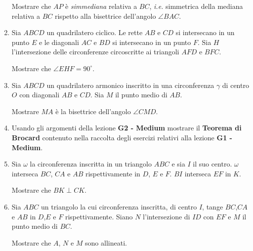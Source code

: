 \begin{enumerate}
    Mostrare che $AP$ è \textit{simmediana} relativa a $BC$, \textit{i.e.} simmetrica della mediana relativa a $BC$ rispetto alla bisettrice dell'angolo $\angle BAC$.
    
    \item Sia $ABCD$ un quadrilatero ciclico. Le rette $AB$ e $CD$ si intersecano in un punto $E$ e le diagonali $AC$ e $BD$ si intersecano in un punto $F$. Sia $H$ l'intersezione delle circonferenze circoscritte ai triangoli $AFD$ e $BFC$. 
    
    Mostrare che $\angle EHF=90^{\circ}$.
    
    \item Sia $ABCD$ un quadrilatero armonico inscritto in una circonferenza $\gamma$ di centro $O$ con diagonali $AB$ e $CD$. Sia $M$ il punto medio di $AB$.
    
    Mostrare $MA$ è la bisettrice dell'angolo $\angle CMD$.
    \item Usando gli argomenti della lezione \textbf{G2 - Medium} mostrare il \textbf{Teorema di Brocard} contenuto nella raccolta degli esercizi relativi alla lezione \textbf{G1 - Medium}. 
    
    \item Sia $\omega$ la circonferenza inscritta in un triangolo $ABC$ e sia $I$ il suo centro. $\omega$ interseca $BC$, $CA$ e $AB$ rispettivamente in $D$, $E$ e $F$. $BI$ interseca $EF$ in $K$.
    
    Mostrare che $BK\perp CK$. 
    \item Sia $ABC$ un triangolo la cui circonferenza inscritta, di centro $I$, tange $BC$,$CA$ e $AB$ in $D$,$E$ e $F$  rispettivamente. Siano $N$ l'intersezione di $ID$ con $EF$ e $M$ il punto medio di $BC$.
    
    Mostrare che $A$, $N$ e $M$ sono allineati.
\end{enumerate}



